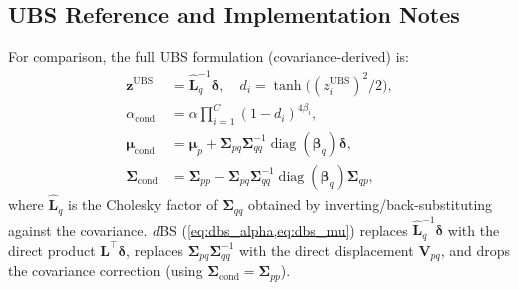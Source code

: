 \documentclass{article}
\newcommand{\dgs}{\textit{d}GS\xspace}
\newcommand{\dbs}{\textit{d}BS\xspace}
\theoremstyle{plain}
\theoremstyle{definition}
\theoremstyle{remark}
\begin{document}
\begin{table}[h]
\centering
\caption{Cross-family comparison of \dgs{} (direct, Gaussian) and UBS (covariance-derived, Beta) on shared static benchmarks (MCMC densification). Both use the same primitive budgets.}
\label{tab:dgs_vs_ubs}
\setlength{\tabcolsep}{4pt}
\end{table}

\subsection{UBS Reference and Implementation Notes}

For comparison, the full UBS formulation (covariance-derived) is:
\begin{align}
\mathbf{z}^{\text{UBS}} &= \hat{\mathbf{L}}_q^{-1} \boldsymbol{\delta}, \quad d_i = \tanh\!\bigl((z_i^{\text{UBS}})^2/2\bigr), \\
\alpha_{\text{cond}} &= \alpha \prod_{i=1}^{C} (1 - d_i)^{4\beta_i}, \\
\boldsymbol{\mu}_{\text{cond}} &= \boldsymbol{\mu}_p + \boldsymbol{\Sigma}_{pq} \boldsymbol{\Sigma}_{qq}^{-1} \operatorname{diag}(\boldsymbol{\beta}_q) \boldsymbol{\delta}, \\
\boldsymbol{\Sigma}_{\text{cond}} &= \boldsymbol{\Sigma}_{pp} - \boldsymbol{\Sigma}_{pq} \boldsymbol{\Sigma}_{qq}^{-1} \operatorname{diag}(\boldsymbol{\beta}_q) \boldsymbol{\Sigma}_{qp},
\end{align}
where $\hat{\mathbf{L}}_q$ is the Cholesky factor of $\boldsymbol{\Sigma}_{qq}$ obtained by inverting/back-substituting against the covariance. \dbs{} (\cref{eq:dbs_alpha,eq:dbs_mu}) replaces $\hat{\mathbf{L}}_q^{-1}\boldsymbol{\delta}$ with the direct product $\mathbf{L}^\top\boldsymbol{\delta}$, replaces $\boldsymbol{\Sigma}_{pq}\boldsymbol{\Sigma}_{qq}^{-1}$ with the direct displacement $\mathbf{V}_{pq}$, and drops the covariance correction (using $\boldsymbol{\Sigma}_{\text{cond}}=\boldsymbol{\Sigma}_{pp}$).
\end{document}
